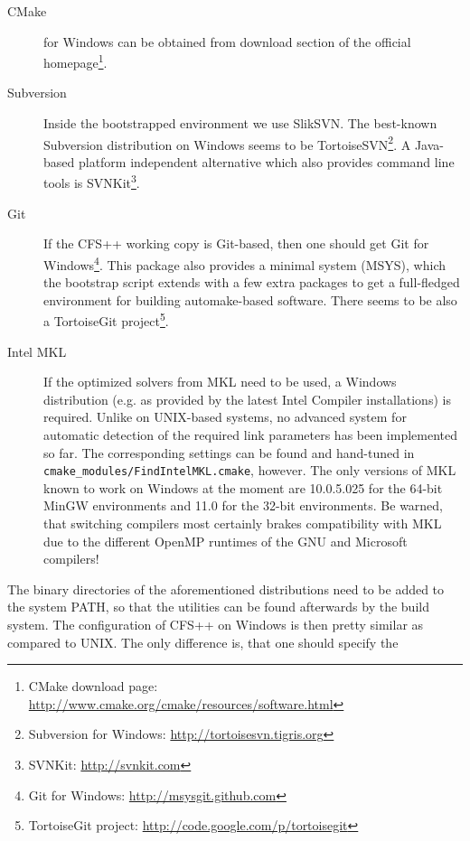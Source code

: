\begin{description}
\item[CMake] for Windows can be obtained from download section of the official
  homepage\footnote{CMake                    download                    page:
    \url{http://www.cmake.org/cmake/resources/software.html}}.

\item[Subversion]  Inside the  bootstrapped  environment we  use SlikSVN.  The
  best-known    Subversion   distribution    on    Windows    seems   to    be
  TortoiseSVN\footnote{Subversion                 for                 Windows:
    \url{http://tortoisesvn.tigris.org}}.   A Java-based  platform independent
  alternative    which     also    provides    command    line     tools    is
  SVNKit\footnote{SVNKit: \url{http://svnkit.com}}.

\item[Git] If the CFS++ working copy is Git-based, then one should get Git for
  Windows\footnote{Git  for  Windows: \url{http://msysgit.github.com}}.   This
  package also  provides a minimal  system (MSYS), which the  bootstrap script
  extends with  a few  extra packages  to get  a full-fledged  environment for
  building  automake-based software.   There seems  to be  also a  TortoiseGit
  project\footnote{TortoiseGit                                        project:
    \url{http://code.google.com/p/tortoisegit}}.

\item[Intel MKL] If the optimized solvers from  MKL need to be used, a Windows
  distribution (e.g. as  provided by the latest  Intel Compiler installations)
  is required. Unlike on UNIX-based  systems, no advanced system for automatic
  detection of the  required link parameters has been implemented  so far. The
  corresponding   settings    can   be   found   and    hand-tuned   in   {\tt
    cmake\_modules/FindIntelMKL.cmake},  however.  The  only  versions of  MKL
  known to work on  Windows at the moment are 10.0.5.025  for the 64-bit MinGW
  environments and 11.0 for the 32-bit environments. Be warned, that switching
  compilers most certainly brakes compatibility  with MKL due to the different
  OpenMP runtimes of the GNU and Microsoft compilers!
\end{description}%
%
The binary directories of the aforementioned distributions need to be added to
the system PATH,  so that the utilities  can be found afterwards  by the build
system.   The configuration  of CFS++  on Windows  is then  pretty similar  as
compared  to  UNIX. The  only  difference  is,  that  one should  specify  the
